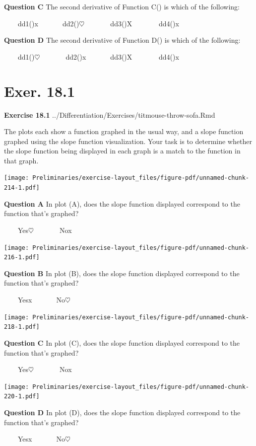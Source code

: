 \documentclass[
  letterpaper,
  DIV=11,
  numbers=noendperiod,
  oneside]{article}
\begin{document}
\begin{multicols}{2}
\textbf{Question C} The second derivative of Function C() is which of
the following:

~~~~{dd1(){x}}~~~~~~~{dd2(){\(\heartsuit\ \)}}~~~~~~~{dd3(){︎X
}}~~~~~~~{dd4(){x}}

\textbf{Question D} The second derivative of Function D() is which of
the following:

~~~~{dd1(){\(\heartsuit\ \)}}~~~~~~~{dd2(){x}}~~~~~~~{dd3(){︎X
}}~~~~~~~{dd4(){x}}

\hypertarget{exer.-18.1}{%
\section*{Exer. 18.1}\label{exer.-18.1}}

\textbf{Exercise 18.1}
../Differentiation/Exercises/titmouse-throw-sofa.Rmd

The plots each show a function graphed in the usual way, and a slope
function graphed using the slope function visualization. Your task is to
determine whether the slope function being displayed in each graph is a
match to the function in that graph.

\texttt{[image: Preliminaries/exercise-layout\_files/figure-pdf/unnamed-chunk-214-1.pdf]}

\textbf{Question A} In plot (A), does the slope function displayed
correspond to the function that's graphed?

~~~~{Yes{\(\heartsuit\ \)}}~~~~~~~{No{x}}

\texttt{[image: Preliminaries/exercise-layout\_files/figure-pdf/unnamed-chunk-216-1.pdf]}

\textbf{Question B} In plot (B), does the slope function displayed
correspond to the function that's graphed?

~~~~{Yes{x}}~~~~~~~{No{\(\heartsuit\ \)}}

\texttt{[image: Preliminaries/exercise-layout\_files/figure-pdf/unnamed-chunk-218-1.pdf]}

\textbf{Question C} In plot (C), does the slope function displayed
correspond to the function that's graphed?

~~~~{Yes{\(\heartsuit\ \)}}~~~~~~~{No{x}}

\texttt{[image: Preliminaries/exercise-layout\_files/figure-pdf/unnamed-chunk-220-1.pdf]}

\textbf{Question D} In plot (D), does the slope function displayed
correspond to the function that's graphed?

~~~~{Yes{x}}~~~~~~~{No{\(\heartsuit\ \)}}


\end{multicols}
\end{document}
